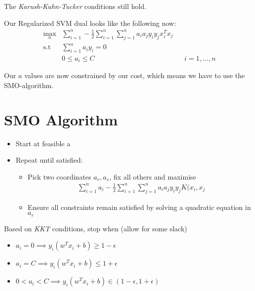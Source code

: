 \documentclass{article}
\begin{document}
  The \emph{Karush-Kuhn-Tucker} conditions still hold. 
  
Our Regularized SVM dual looks like the following now:
    \begin{align}
        \max_{a} & \sum_{i=1}^{n} - \frac{1}{2}\sum_{i=1}^{n}\sum_{j=1}^{n} a_i a_j y_i y_j x^T_i x_j\\
        \text{s.t } & \sum_{i=1}^{n}a_i y_i = 0\\
        & 0 \leq a_i \leq C && i = 1, \dots, n
    \end{align}
    
    Our $a$ values are now constrained by our cost, which means we have to use the SMO-algorithm.

\section{SMO Algorithm}
    \begin{itemize}
        \item Start at feasible a
        \item Repeat until satisfied: \begin{itemize}
            \item Pick two coordinates $a_r, a_s$, fix all others and maximise \begin{align}
                \sum_{i=1}^{n} a_i - \frac{1}{2}\sum_{i=1}^{n}\sum_{j=1}^{n}a_i a_j y_i y_j K(x_i, x_j
            \end{align}
            \item Ensure all constraints remain satisfied by solving a quadratic equation in $a_r$
        \end{itemize}
    \end{itemize}
    
    Based on \emph{KKT} conditions, stop when (allow for some slack)
    \begin{itemize}
        \item $a_i = 0 \implies y_i (w^T x_i + b) \geq 1 - \epsilon$
        \item $a_i = C \implies y_i(w^T x_i + b) \leq 1 + \epsilon$
        \item $0 < a_i < C \implies y_i(w^T x_i + b) \in (1 - \epsilon, 1 + \epsilon)$
    \end{itemize}
    
\end{document}
